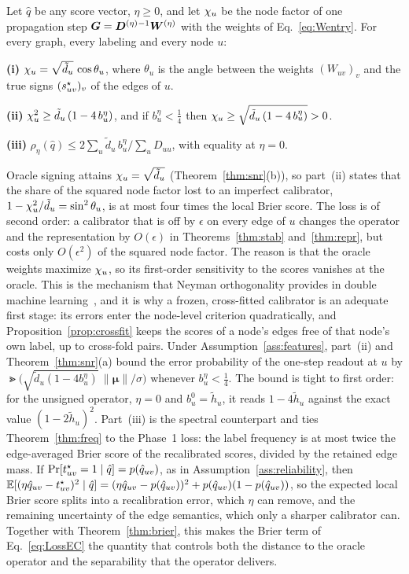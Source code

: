 \begin{theorem}\label{thm:brier-snr}
Let $\hat q$ be any score vector, $\eta\ge0$, and let $\chi_u$ be the node factor of one propagation step $\bm G=\bm{D}^{(\eta)}{}^{-1}\bm{W}^{(\eta)}$ with the weights of Eq.~\eqref{eq:Wentry}. For every graph, every labeling and every node $u$:

\smallskip\noindent\textbf{(i)} $\chi_u=\sqrt{\tilde d_u}\,\cos\theta_u$, where $\theta_u$ is the angle between the weights $(W_{uv})_v$ and the true signs $(s^{\star}_{uv})_v$ of the edges of $u$.

\smallskip\noindent\textbf{(ii)} $\chi_u^2\ge\tilde d_u\,(1-4\,b^{\eta}_u)$, and if $b^{\eta}_u<\tfrac14$ then $\chi_u\ge\sqrt{\tilde d_u\,(1-4\,b^{\eta}_u)}>0$.

\smallskip\noindent\textbf{(iii)} $\rho_\eta(\hat q)\le2\sum_u\tilde d_u\,b^{\eta}_u\big/\sum_uD_{uu}$, with equality at $\eta=0$.
\end{theorem}

Oracle signing attains $\chi_u=\sqrt{\tilde d_u}$ (Theorem~\ref{thm:snr}(b)), so part~(ii) states that the share of the squared node factor lost to an imperfect calibrator, $1-\chi_u^2/\tilde d_u=\sin^2\theta_u$, is at most four times the local Brier score.
The loss is of second order: a calibrator that is off by $\epsilon$ on every edge of $u$ changes the operator and the representation by $O(\epsilon)$ in Theorems~\ref{thm:stab} and~\ref{thm:repr}, but costs only $O(\epsilon^2)$ of the squared node factor.
The reason is that the oracle weights maximize $\chi_u$, so its first-order sensitivity to the scores vanishes at the oracle.
This is the mechanism that Neyman orthogonality provides in double machine learning~\citep{DML}, and it is why a frozen, cross-fitted calibrator is an adequate first stage: its errors enter the node-level criterion quadratically, and Proposition~\ref{prop:crossfit} keeps the scores of a node's edges free of that node's own label, up to cross-fold pairs.
Under Assumption~\ref{ass:features}, part~(ii) and Theorem~\ref{thm:snr}(a) bound the error probability of the one-step readout at $u$ by $\Gt\bigl(\sqrt{\tilde d_u(1-4b^{\eta}_u)}\,\|\bm\mu\|/\sigma\bigr)$ whenever $b^{\eta}_u<\tfrac14$.
The bound is tight to first order: for the unsigned operator, $\eta=0$ and $b^{0}_u=\tilde h_u$, it reads $1-4\tilde h_u$ against the exact value $(1-2\tilde h_u)^2$.
Part~(iii) is the spectral counterpart and ties Theorem~\ref{thm:freq} to the Phase~1 loss: the label frequency is at most twice the edge-averaged Brier score of the recalibrated scores, divided by the retained edge mass.
If $\Pr[t^{\star}_{uv}=1\mid\hat q]=p(\hat q_{uv})$, as in Assumption~\ref{ass:reliability}, then $\mathbb E[(\eta\hat q_{uv}-t^{\star}_{uv})^2\mid\hat q]=(\eta\hat q_{uv}-p(\hat q_{uv}))^2+p(\hat q_{uv})(1-p(\hat q_{uv}))$, so the expected local Brier score splits into a recalibration error, which $\eta$ can remove, and the remaining uncertainty of the edge semantics, which only a sharper calibrator can.
Together with Theorem~\ref{thm:brier}, this makes the Brier term of Eq.~\eqref{eq:LossEC} the quantity that controls both the distance to the oracle operator and the separability that the operator delivers.

